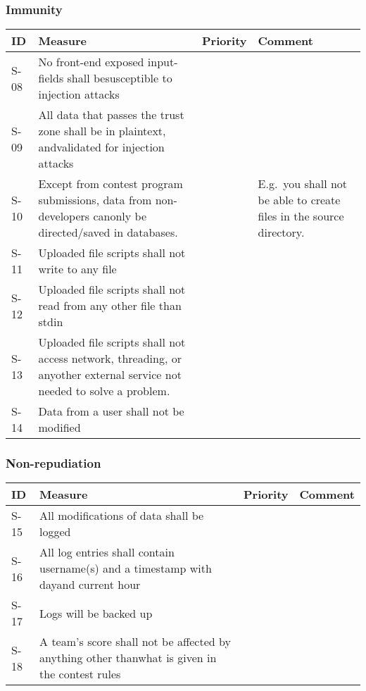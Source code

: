 \subsubsection{Immunity}
\begin{supertabular}{|l|p{7cm}|l|p{5cm}|}
\hline
\textbf{ID} & \textbf{Measure} & \textbf{Priority} & \textbf{Comment} \\ 
\hline
S-08 & No front-end exposed input-fields shall besusceptible to injection
attacks & & \\ 
\hline

S-09 & All data that passes the trust zone shall be in plaintext, andvalidated
for injection attacks & & \\ 
\hline

S-10 & Except from contest program submissions, data from non-developers
canonly be directed/saved in databases. & & E.g.\ you shall not be able to
create files in the source directory.\\ 
\hline

S-11 & Uploaded file scripts shall not write to any file & & \\ 
\hline

S-12 & Uploaded file scripts shall not read from any other file than stdin && \\ 
\hline

S-13 & Uploaded file scripts shall not access network, threading, or anyother
external service not needed to solve a problem.  & & \\ 
\hline

S-14 & Data from a user shall not be modified & & \\ 
\hline
\end{supertabular}


\subsubsection{Non-repudiation}
\begin{supertabular}{|l|p{7cm}|l|p{5cm}|}
\hline
\textbf{ID} & \textbf{Measure} & \textbf{Priority} & \textbf{Comment} \\ 
\hline
S-15 & All modifications of data shall be logged & &\\ 
\hline

S-16 & All log entries shall contain username(s) and a timestamp with dayand
current hour & & \\ 
\hline

S-17 & Logs will be backed up & & \\
\hline

S-18 & A team's score shall not be affected by anything other thanwhat is given
in the contest rules & & \\ 
\hline
\end{supertabular}

